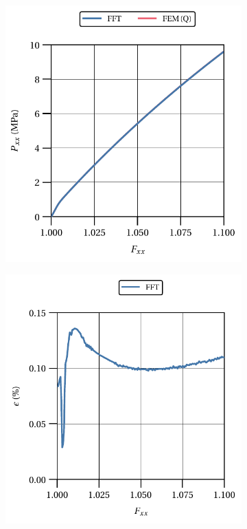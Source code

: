 \begin{figure}[hbt]
  \centering
  	\begin{subfigure}[b]{0.49\textwidth}
      \centering
      \includegraphics[width=\textwidth]{figures/von_mises_res_mat_large_strain_2D_normal_material_response}
      \caption{}
      \label{subfig:von_mises_res_mat_large_strain_2D_normal_material_response}
    \end{subfigure}
    \begin{subfigure}[b]{0.49\textwidth}
      \centering
      \includegraphics[width=\textwidth]{figures/von_mises_res_mat_large_strain_2D_normal_material_response_error}

\end{subfigure}
\end{figure}
